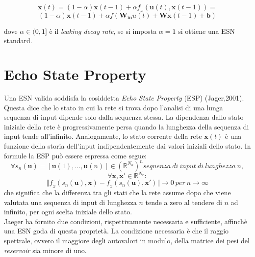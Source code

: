 \begin{equation} \label{attivazionelr}
\mathbf{x}(\mathit{t})=(1-\alpha) \mathbf{x}(\mathit{t - 1} ) + \alpha \mathit{f}_\mathit{x} (\mathbf{u}(\mathit{t}), \mathbf{x}(\mathit{t} - 1)) = 
\end{equation}
\begin{displaymath}
(1-\alpha) \mathbf{x}(\mathit{t - 1} ) + \alpha f(\mathbf{W_{in}}u(\mathit{t}) + \mathbf{Wx}(\mathit{t - 1} ) + \mathbf{b} )
\end{displaymath}  

dove $\alpha \in (0,1]$ è il \textit{leaking decay rate}, se si  
imposta $\alpha=1$ si ottiene una ESN standard.

\section{Echo State Property}
Una ESN valida soddisfa la cosiddetta \textit{Echo State Property} (ESP) (Jager,2001). Questa dice che lo stato in cui la rete si trova dopo l'analisi di una lunga sequenza di input dipende solo dalla sequenza stessa. La dipendenza dallo stato iniziale della rete è progressivamente persa quando la lunghezza della sequenza di input tende all'infinito. Analogamente, lo stato corrente della rete $\mathbf{x}(\mathit{t})$ è una funzione della storia dell'input indipendentemente dai valori iniziali dello stato. In formule la ESP può essere espressa come segue:
\begin{displaymath}
\forall s_n(\mathbf{u}) = [\mathbf{u}(1),...,\mathbf{u}(\mathit{n})] \in (\mathbb{R}^{N_u})^n sequenza\ di\ input\ di\ lunghezza\ n,
\end{displaymath}
\begin{equation}\label{ESP}
\forall \mathbf{x}, \mathbf{x'} \in \mathbb{R}^{N_r}:
\end{equation}
\begin{displaymath}
 \Vert \mathit{f_x}(s_n(\mathbf{u}), \mathbf{x}) - \mathit{f_x}(s_n(\mathbf{u}), \mathbf{x'}) \Vert \rightarrow 0\ per\ \mathit{n} \rightarrow \infty
\end{displaymath}
che significa che la differenza tra gli stati che la rete assume dopo che viene valutata una sequenza di input di lunghezza $n$ tende a zero al tendere di $n$ ad infinito, per ogni scelta iniziale dello stato.\\
Jaeger ha fornito due condizioni, rispettivamente necessaria e sufficiente, affinchè una ESN goda di questa proprietà. La condizione necessaria è che il raggio spettrale, ovvero il maggiore degli autovalori in modulo, della matrice dei pesi del \textit{reservoir} sia minore di uno.
